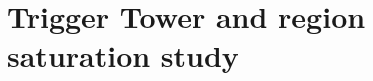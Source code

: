 \documentclass[8pt]{beamer}
\begin{document}
%  
%  
% 
%  
%  
%  
% 
%  

\section{Trigger Tower and region saturation study}
\end{document}

